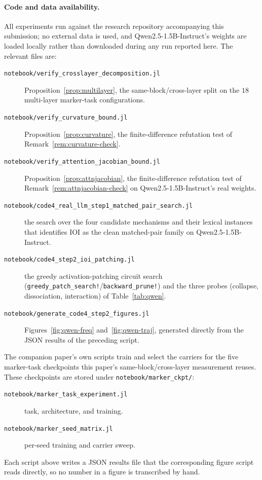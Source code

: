 \documentclass[11pt,a4paper]{article}
\begin{document}
\paragraph{Code and data availability.} All experiments run against the
research repository accompanying this submission; no external data is used,
and Qwen2.5-1.5B-Instruct's weights are loaded locally rather than
downloaded during any run reported here. The relevant files are:
\begin{description}
\item[\texttt{notebook/\allowbreak verify\_crosslayer\_decomposition.jl}]\hfill\break
Proposition~\ref{prop:multilayer}, the same-block/cross-layer split on the
$18$ multi-layer marker-task configurations.
\item[\texttt{notebook/\allowbreak verify\_curvature\_bound.jl}]\hfill\break
Proposition~\ref{prop:curvature}, the finite-difference refutation test of
Remark~\ref{rem:curvature-check}.
\item[\texttt{notebook/\allowbreak verify\_attention\_jacobian\_bound.jl}]\hfill\break
Proposition~\ref{prop:attnjacobian}, the finite-difference refutation test
of Remark~\ref{rem:attnjacobian-check} on Qwen2.5-1.5B-Instruct's real
weights.
\item[\texttt{notebook/\allowbreak code4\_real\_llm\_step1\_matched\_pair\_search.jl}]\hfill\break
the search over the four candidate mechanisms and their lexical instances
that identifies IOI as the clean matched-pair family on Qwen2.5-1.5B-Instruct.
\item[\texttt{notebook/\allowbreak code4\_step2\_ioi\_patching.jl}]\hfill\break
the greedy activation-patching circuit search
(\texttt{greedy\_patch\_search!}/\texttt{backward\_prune!}) and the three
probes (collapse, dissociation, interaction) of Table~\ref{tab:qwen}.
\item[\texttt{notebook/\allowbreak generate\_code4\_step2\_figures.jl}]\hfill\break
Figures~\ref{fig:qwen-freq} and~\ref{fig:qwen-traj}, generated directly from
the JSON results of the preceding script.
\end{description}
The companion paper's own scripts train and select the carriers for the
five marker-task checkpoints this paper's same-block/cross-layer measurement
reuses. These checkpoints are stored under \texttt{notebook/marker\_ckpt/}:
\begin{description}
\item[\texttt{notebook/\allowbreak marker\_task\_experiment.jl}]\hfill\break
task, architecture, and training.
\item[\texttt{notebook/\allowbreak marker\_seed\_matrix.jl}]\hfill\break
per-seed training and carrier sweep.
\end{description}
Each script above writes a JSON results file that the corresponding figure
script reads directly, so no number in a figure is transcribed by hand.
\end{document}
